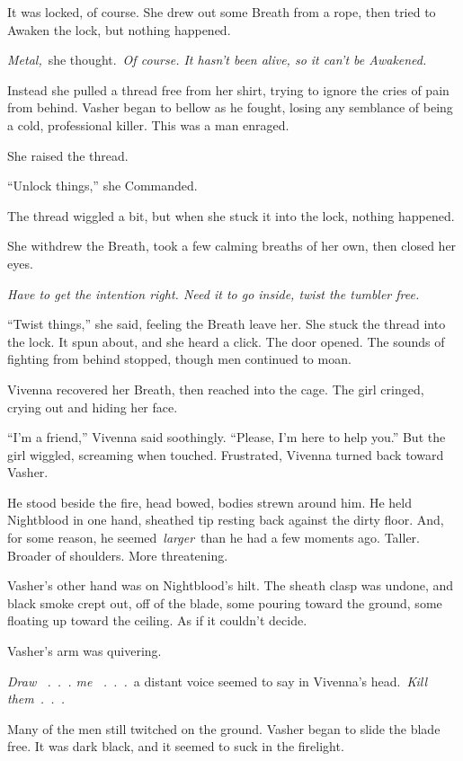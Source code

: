 It was locked, of course. She drew out some Breath from a rope, then tried to Awaken the lock, but nothing happened.

\textit{Metal,}~she thought.~\textit{Of course. It hasn’t been alive, so it can’t be Awakened.}

Instead she pulled a thread free from her shirt, trying to ignore the cries of pain from behind. Vasher began to bellow as he fought, losing any semblance of being a cold, professional killer. This was a man enraged.

She raised the thread.

“Unlock things,” she Commanded.

The thread wiggled a bit, but when she stuck it into the lock, nothing happened.

She withdrew the Breath, took a few calming breaths of her own, then closed her eyes.

\textit{Have to get the intention right. Need it to go inside, twist the tumbler free.}

“Twist things,” she said, feeling the Breath leave her. She stuck the thread into the lock. It spun about, and she heard a click. The door opened. The sounds of fighting from behind stopped, though men continued to moan.

Vivenna recovered her Breath, then reached into the cage. The girl cringed, crying out and hiding her face.

“I’m a friend,” Vivenna said soothingly. “Please, I’m here to help you.” But the girl wiggled, screaming when touched. Frustrated, Vivenna turned back toward Vasher.

He stood beside the fire, head bowed, bodies strewn around him. He held Nightblood in one hand, sheathed tip resting back against the dirty floor. And, for some reason, he seemed~\textit{larger}~than he had a few moments ago. Taller. Broader of shoulders. More threatening.

Vasher’s other hand was on Nightblood’s hilt. The sheath clasp was undone, and black smoke crept out, off of the blade, some pouring toward the ground, some floating up toward the ceiling. As if it couldn’t decide.

Vasher’s arm was quivering.

\textit{Draw ~.~.~. me ~.~.~.}~a distant voice seemed to say in Vivenna’s head.~\textit{Kill them~.~.~.}

Many of the men still twitched on the ground. Vasher began to slide the blade free. It was dark black, and it seemed to suck in the firelight.

